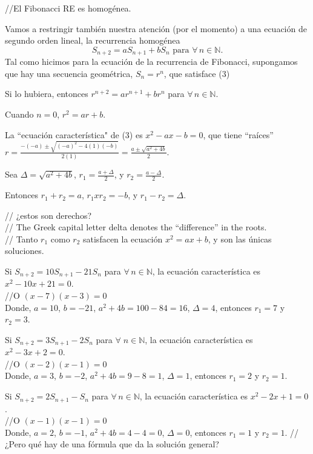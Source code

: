 //El Fibonacci RE es homogénea.

Vamos a restringir también nuestra atención (por el momento) a una ecuación de segundo orden lineal, la recurrencia homogénea
\begin{equation}
S_{n+2}=aS_{n+1}+bS_{n}\text{ para }\forall\,n\in\mathds{N}.
\end{equation}
Tal como hicimos para la ecuación de la recurrencia de Fibonacci, supongamos que hay una secuencia geométrica, $S_n=r^n$, que satisface (3)

Si lo hubiera, entonces $r^{n+2}=ar^{n+1}+br^{n}$ para $\forall\,n\in\mathds{N}$.

Cuando $n = 0$, $r^2=ar+b$.

La ``ecuación característica" de (3) es $x^2-ax-b=0$, que tiene ``raíces'' $r=\frac{-(-a)\pm\sqrt{(-a)^2-4(1)(-b)}}{2(1)}=\frac{a\pm\sqrt{a^2+4b}}{2}$.

Sea $\Delta=\sqrt{a^2+4b}$, $r_1=\frac{a+\Delta}{2}$, y $r_2=\frac{a-\Delta}{2}$.

Entonces $r_{1}+r_{2}=a$, $r_{1}xr_{2}=-b$, y $r_{1}-r_{2}=\Delta$.

// ¿estos son derechos?\\
// The Greek capital letter delta denotes the “difference” in the roots.\\
// Tanto $r_1$ como $r_2$ satisfacen la ecuación $x^2 = ax + b$, y son las únicas soluciones.

\begin{example}{}
Si $S_{n+2}=10S_{n+1}-21S_n$ para $\forall\,n\in\mathds{N}$, la ecuación característica es $x^{2}-10x+21=0$.\\
//O $(x-7)(x-3)=0$\\
Donde, $a=10$, $b=-21$, $a^2+4b=100-84=16$, $\Delta = 4$, entonces $r_{1}=7$ y $r_{2}=3$.
\end{example}

\begin{example}{}
Si $S_{n+2} = 3S_{n+1}-2S_{n}$ para $\forall \; n \in \mathbb{N}$, la ecuación característica es $x^2-3x+2=0$.\\
//O $(x-2)(x-1)=0$\\
Donde, $a=3$, $b=-2$, $a^2+4b=9-8=1$, $\Delta = 1$, entonces $r_1=2$ y $r_2=1$.
\end{example}

\begin{example}{}
Si $S_{n+2}=2S_{n+1}-S_{n}$ para $\forall\,n\in\mathds{N}$, la ecuación característica es $x^{2}-2x+1=0$.\\
//O $(x-1)(x-1)=0$\\
Donde, $a=2$, $b=-1$, $a^2+4b=4-4=0$, $\Delta = 0$, entonces $r_{1}=1$ y $r_{2}=1$.
// ¿Pero qué hay de una fórmula que da la solución general?
\end{example}

